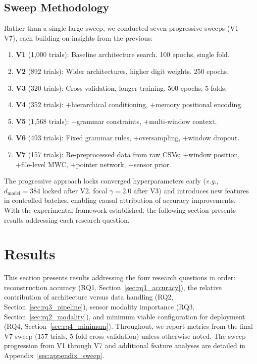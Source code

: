 \documentclass[sensors,article,submit,moreauthors,pdftex]{Definitions/mdpi}
\newcommand{\eg}{\textit{e.g.}}
\begin{document}
\subsection{Sweep Methodology}

Rather than a single large sweep, we conducted seven progressive sweeps (V1--V7), each building on insights from the previous:

\begin{enumerate}[leftmargin=*]
    \item \textbf{V1} (1{,}000 trials): Baseline architecture search. 100 epochs, single fold.
    \item \textbf{V2} (892 trials): Wider architectures, higher digit weights. 250 epochs.
    \item \textbf{V3} (320 trials): Cross-validation, longer training. 500 epochs, 5 folds.
    \item \textbf{V4} (352 trials): +hierarchical conditioning, +memory positional encoding.
    \item \textbf{V5} (1{,}568 trials): +grammar constraints, +multi-window context.
    \item \textbf{V6} (493 trials): Fixed grammar rules, +oversampling, +window dropout.
    \item \textbf{V7} (157 trials): Re-preprocessed data from raw CSVs; +window position, +file-level MWC, +pointer network, +sensor prior.
\end{enumerate}

The progressive approach locks converged hyperparameters early (\eg, $d_\text{model} = 384$ locked after V2, focal $\gamma = 2.0$ after V3) and introduces new features in controlled batches, enabling causal attribution of accuracy improvements. With the experimental framework established, the following section presents results addressing each research question.

\section{Results}
\label{sec:results}

This section presents results addressing the four research questions in order: reconstruction accuracy (RQ1, Section~\ref{sec:rq1_accuracy}), the relative contribution of architecture versus data handling (RQ2, Section~\ref{sec:rq3_pipeline}), sensor modality importance (RQ3, Section~\ref{sec:rq2_modality}), and minimum viable configuration for deployment (RQ4, Section~\ref{sec:rq4_minimum}). Throughout, we report metrics from the final V7 sweep (157 trials, 5-fold cross-validation) unless otherwise noted. The sweep progression from V1 through V7 and additional feature analyses are detailed in Appendix~\ref{sec:appendix_sweep}.
\end{document}

